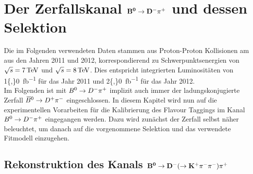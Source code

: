 \chapter[head={Der Zerfallskanal $\Bz\rightarrow \Dm\pip$ und dessen Selektion},tocentry={Der Zerfallskanal $\mathbf{\Bz\rightarrow \Dm\pip}$ und dessen Selektion}]{Der Zerfallskanal $\mathbf{\Bz\rightarrow \Dm\pip}$ und dessen Selektion}

Die im Folgenden verwendeten Daten stammen aus Proton-Proton Kollisionen am \lhc aus den Jahren 2011 und 2012, korrespondierend zu Schwerpunktsenergien von $\protect\sqrt{s}=\SI{7}{TeV}$ und $\protect\sqrt{s}=\SI{8}{TeV}$. Dies entspricht integrierten Luminositäten von \SI{1{,}0}{fb^{-1}} für das Jahr 2011 und \SI{2{,}0}{fb^{-1}} für das Jahr 2012.\\
Im Folgenden ist mit $\Bz\rightarrow \Dm\pip$ implizit auch immer der ladungskonjugierte Zerfall ${{\kern 0.18em\overline{\kern -0.18em B}{}}{}^0}\rightarrow {\ensuremath{{D}^+}}{\ensuremath{{\pi}^-}}$ eingeschlossen. In diesem Kapitel wird nun auf die experimentellen Vorarbeiten für die Kalibrierung des Flavour Taggings im Kanal $\Bz\rightarrow \Dm\pip$ eingegangen werden. Dazu wird zunächst der Zerfall selbst näher beleuchtet, um danach auf die vorgenommene Selektion und das verwendete Fitmodell einzugehen.

\section[head={Rekonstruktion des Kanals $\Bz\rightarrow \Dm(\rightarrow \Kp\pim\pim)\pip$},tocentry={Rekonstruktion des Kanals $\Bz\rightarrow \Dm(\rightarrow \Kp\pim\pim)\pip$}]{Rekonstruktion des Kanals $\mathbf{{{B}^0}\rightarrow {\ensuremath{{D}^-}}(\rightarrow {\ensuremath{{K}^+}}{\ensuremath{{\pi}^-}}{\ensuremath{{\pi}^-}}){{\pi}^+}}$}

